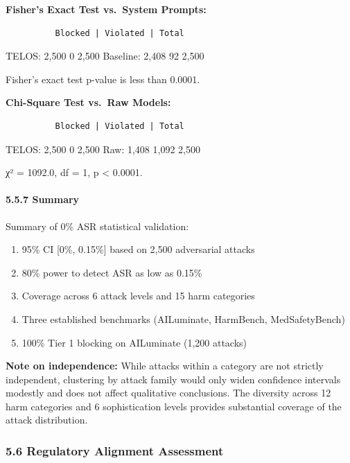 \textbf{Fisher's Exact Test vs.~System Prompts:}

\begin{verbatim}
          Blocked | Violated | Total
\end{verbatim}

TELOS: 2,500 \textbar{} 0 \textbar{} 2,500 Baseline: 2,408 \textbar{} 92
\textbar{} 2,500

Fisher's exact test p-value is less than 0.0001.

\textbf{Chi-Square Test vs.~Raw Models:}

\begin{verbatim}
          Blocked | Violated | Total
\end{verbatim}

TELOS: 2,500 \textbar{} 0 \textbar{} 2,500 Raw: 1,408 \textbar{} 1,092
\textbar{} 2,500

χ² = 1092.0, df = 1, p \textless{} 0.0001.

\paragraph{5.5.7 Summary}\label{summary}

Summary of 0\% ASR statistical validation:

\begin{enumerate}
\def\labelenumi{\arabic{enumi}.}
\tightlist
\item
  95\% CI {[}0\%, 0.15\%{]} based on 2,500 adversarial attacks
\item
  80\% power to detect ASR as low as 0.15\%
\item
  Coverage across 6 attack levels and 15 harm categories
\item
  Three established benchmarks (AILuminate, HarmBench, MedSafetyBench)
\item
  100\% Tier 1 blocking on AILuminate (1,200 attacks)
\end{enumerate}

\textbf{Note on independence:} While attacks within a category are not
strictly independent, clustering by attack family would only widen
confidence intervals modestly and does not affect qualitative
conclusions. The diversity across 12 harm categories and 6
sophistication levels provides substantial coverage of the attack
distribution.

\subsubsection{5.6 Regulatory Alignment
Assessment}\label{regulatory-alignment-assessment}

